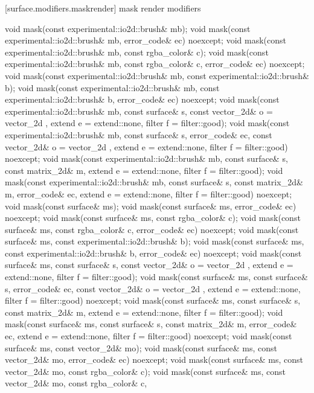  [surface.modifiers.maskrender] { mask render modifiers}

\begin{itemdecl}
void mask(const experimental::io2d::brush& mb);
void mask(const experimental::io2d::brush& mb, error_code& ec)
  noexcept;
void mask(const experimental::io2d::brush& mb, const rgba_color& c);
void mask(const experimental::io2d::brush& mb, const rgba_color& c, 
  error_code& ec) noexcept;
void mask(const experimental::io2d::brush& mb,
  const experimental::io2d::brush& b);
void mask(const experimental::io2d::brush& mb,
  const experimental::io2d::brush& b, error_code& ec) noexcept;
void mask(const experimental::io2d::brush& mb, const surface& s,
  const vector_2d& o = vector_2d{ }, extend e = extend::none, 
  filter f = filter::good);
void mask(const experimental::io2d::brush& mb, const surface& s,
  error_code& ec, const vector_2d& o = vector_2d{ },
  extend e = extend::none, filter f = filter::good) noexcept;
void mask(const experimental::io2d::brush& mb, const surface& s,
  const matrix_2d& m, extend e = extend::none, filter f = filter::good);
void mask(const experimental::io2d::brush& mb, const surface& s,
  const matrix_2d& m, error_code& ec, extend e = extend::none,
  filter f = filter::good) noexcept;
void mask(const surface& ms);
void mask(const surface& ms, error_code& ec) noexcept;
void mask(const surface& ms, const rgba_color& c);
void mask(const surface& ms, const rgba_color& c, error_code& ec) noexcept;
void mask(const surface& ms, const experimental::io2d::brush& b);
void mask(const surface& ms, const experimental::io2d::brush& b, 
  error_code& ec) noexcept;
void mask(const surface& ms, const surface& s,
  const vector_2d& o = vector_2d{ }, extend e = extend::none,
  filter f = filter::good);
void mask(const surface& ms, const surface& s, error_code& ec,
  const vector_2d& o = vector_2d{ }, extend e = extend::none,
  filter f = filter::good) noexcept;
void mask(const surface& ms, const surface& s, const matrix_2d& m,
  extend e = extend::none, filter f = filter::good);
void mask(const surface& ms, const surface& s, const matrix_2d& m,
  error_code& ec, extend e = extend::none, filter f = filter::good)
  noexcept;
void mask(const surface& ms, const vector_2d& mo);
void mask(const surface& ms, const vector_2d& mo, error_code& ec) noexcept;
void mask(const surface& ms, const vector_2d& mo, const rgba_color& c);
void mask(const surface& ms, const vector_2d& mo, const rgba_color& c,

\end{itemdecl}
